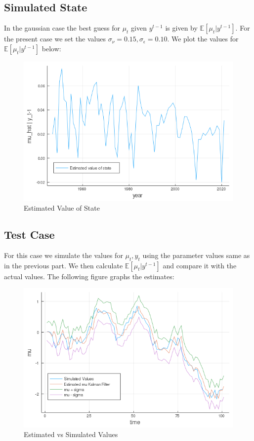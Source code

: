 \documentclass[12pt]{article}
\begin{document}
\subsection{Simulated State}
In the gaussian case the best guess for $\mu_t$ given $y^{t-1}$ is given by $\mathbb{E}[\mu_t| y^{t-1}]$. For the present case we set the values $\sigma_{\nu} = 0.15, \sigma_{\epsilon} = 0.10$. We plot the values for  $\mathbb{E}[\mu_t| y^{t-1}]$ below:
\begin{figure}[h]
\centering
\includegraphics[scale=0.5]{2_a.png}
\caption{Estimated Value of State}
\end{figure}


\subsection{Test Case}
For this case we simulate the values for $\mu_t, y_t$ using the parameter values same as in the previous part. We then calculate $\mathbb{E}[\mu_t|y^{t-1}]$ and compare it with the actual values. The following figure graphs the estimates:
\begin{figure}[h]
\centering
\includegraphics[scale=0.5]{2_b.png}
\caption{Estimated vs Simulated Values}
\end{figure}
\end{document}

